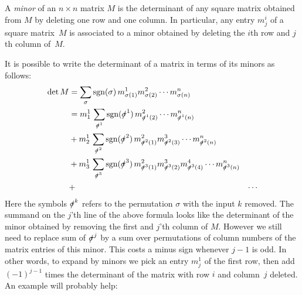 A \emph{minor} of an $n\times n$ matrix $M$ is the determinant of any square matrix obtained from $M$ by deleting one row and one column.  In particular, any entry $m^i_j$ of a square matrix~$M$ is associated to a minor obtained by deleting the $i$th row and $j$th column of~$M$.

It is possible to write the determinant of a matrix in terms of  its minors as follows:
\begin{align*}
\det M &=\sum_{\sigma} \text{sgn}(\sigma)\, m^1_{\sigma(1)}m^2_{\sigma(2)}\cdots m^n_{\sigma(n)} \\
&=m^1_1\, \sum_{\slashed{\sigma}^1} \text{sgn}(\slashed{\sigma}^1)\, m^2_{\slashed{\sigma}^1(2)}\cdots m^n_{\slashed{\sigma}^1(n)} \\
& + m^1_2\, \sum_{\slashed{\sigma}^2} \text{sgn}(\slashed{\sigma}^2)\, m^2_{\slashed{\sigma}^2(1)}
m^3_{\slashed{\sigma}^2(3)}\cdots m^n_{\slashed{\sigma}^2(n)} \\
& + m^1_3\,  \sum_{\slashed{\sigma}^3} \text{sgn}(\slashed{\sigma}^3)\, m^2_{\slashed{\sigma}^3(1)}m^3_{\slashed{\sigma}^3(2)}m^4_{\slashed{\sigma}^3(4)}\cdots m^n_{\slashed{\sigma}^3(n)}\\ &+& \cdots
\end{align*}
Here the symbols $\slashed{\sigma}^k$ 
refers to the permutation $\sigma$ with the input $k$ removed.
The summand on  the $j$'th line of the above formula looks like the determinant of the minor obtained by removing the first  and $j$'th column of $M$. However we still need to  replace sum of $\slashed{\sigma}^j$ by a sum over permutations of  column numbers of the matrix entries of this minor. This costs a minus sign whenever $j-1$ is odd.
In other words, to expand by minors we pick an entry $m^1_j$ of the first row, then add $(-1)^{j-1}$ times the determinant of the matrix with row $i$ and column~$j$ deleted. An example will probably help:

